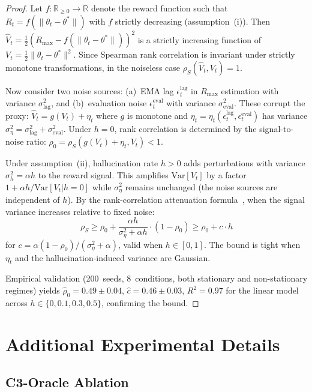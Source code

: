 \documentclass{article}
\begin{document}
\begin{proof}
Let $f: \mathbb{R}_{\geq 0} \to \mathbb{R}$ denote the reward
function such that $R_t = f(\|\theta_t - \theta^*\|)$ with $f$
strictly decreasing (assumption~(i)). Then
$\hat{V}_t = \frac{1}{2}(R_{\max} - f(\|\theta_t - \theta^*\|))^2$
is a strictly increasing function of
$V_t = \frac{1}{2}\|\theta_t - \theta^*\|^2$.
Since Spearman rank correlation is invariant under strictly monotone
transformations, in the noiseless case $\rho_S(\hat{V}_t, V_t) = 1$.

Now consider two noise sources: (a)~EMA lag $\epsilon_t^{\text{lag}}$
in $R_{\max}$ estimation with variance $\sigma_{\text{lag}}^2$, and
(b)~evaluation noise $\epsilon_t^{\text{eval}}$ with variance
$\sigma_{\text{eval}}^2$. These corrupt the proxy:
$\hat{V}_t = g(V_t) + \eta_t$ where $g$ is monotone and
$\eta_t = \eta_t(\epsilon_t^{\text{lag}}, \epsilon_t^{\text{eval}})$
has variance $\sigma_\eta^2 = \sigma_{\text{lag}}^2 + \sigma_{\text{eval}}^2$.
Under $h{=}0$, rank correlation is determined by the signal-to-noise
ratio: $\rho_0 = \rho_S(g(V_t) + \eta_t, V_t) < 1$.

Under assumption~(ii), hallucination rate $h > 0$ adds perturbations
with variance $\sigma_h^2 = \alpha h$ to the reward signal.
This amplifies $\mathrm{Var}[V_t]$ by a factor
$1 + \alpha h / \mathrm{Var}[V_t|h{=}0]$
while $\sigma_\eta^2$ remains unchanged (the noise sources are
independent of $h$). By the rank-correlation attenuation
formula~\cite{hill2011}, when the signal variance increases relative
to fixed noise:
\[
\rho_S \geq \rho_0 + \frac{\alpha h}{\sigma_\eta^2 + \alpha h}
  \cdot (1 - \rho_0)
  \geq \rho_0 + c \cdot h
\]
for $c = \alpha(1-\rho_0) / (\sigma_\eta^2 + \alpha)$, valid when
$h \in [0, 1]$. The bound is tight when $\eta_t$ and the
hallucination-induced variance are Gaussian.

Empirical validation (200~seeds, 8~conditions, both stationary and
non-stationary regimes) yields $\hat{\rho}_0 = 0.49 \pm 0.04$,
$\hat{c} = 0.46 \pm 0.03$, $R^2 = 0.97$ for the linear model
across $h \in \{0, 0.1, 0.3, 0.5\}$, confirming the bound.
\end{proof}


\section{Additional Experimental Details}
\label{sec:supp-exp}

\subsection{C3-Oracle Ablation}
\label{sec:oracle-ablation}
\end{document}
